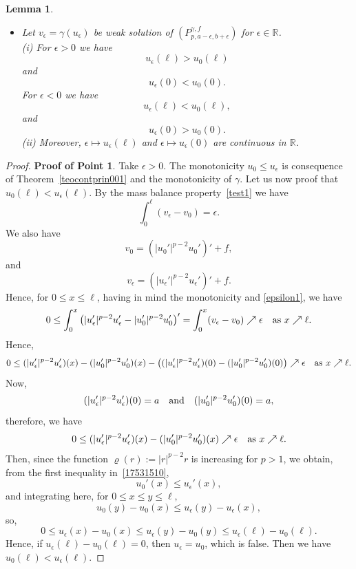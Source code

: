 \documentclass[reqno,12pt]{amsart}
\newtheorem{lemma}[theorem]{Lemma} %
\numberwithin{equation}{section} %
\begin{document}
\begin{lemma}
\begin{itemize}
\item[3.] Let   $v_\epsilon=\gamma(u_\epsilon)$ be weak solution of $(P_{p,a-\epsilon,b+\epsilon}^{\gamma,f})$ for $\epsilon\in \mathbb{R}$.
\\
(i) For $\epsilon>0$ we have
$$u_\epsilon(\ell)> u_0(\ell)$$ and
$$u_\epsilon(0)< u_0(0).$$
 For $\epsilon<0$ we have
$$u_\epsilon(\ell)< u_0(\ell),$$ and
$$u_\epsilon(0)> u_0(0).$$
(ii) Moreover, $\epsilon\mapsto u_\epsilon(\ell)$ and $\epsilon\mapsto u_\epsilon(0)$ are continuous in $\mathbb{R}$. 
 \end{itemize}
 \end{lemma}
 
 \begin{proof}  {\bf Proof of Point 1}.    Take  $\epsilon>0$.  The monotonicity  $ u_0 \leq u_\epsilon$ is consequence of Theorem~\ref{teocontprin001} and the monotonicity of $\gamma$. 
 Let us now proof that $u_0(\ell) <u_\epsilon(\ell)$. 
By the mass balance property~\eqref{test1} we have
  \begin{equation}\label{epsilon1}
\int_0^{\ell} (v_\epsilon - v_0) = \epsilon.
  \end{equation}
We also have 
$$v_0 = \left(|u_0'|^{p-2}u_0' \right)' + f,$$
and
  $$v_\epsilon = \left(|u_\epsilon'|^{p-2}u_\epsilon' \right)' + f. $$
Hence, for $0 \leq x \leq \ell$, having in mind the monotonicity and \eqref{epsilon1}, we have
$$0\le \int_0^x \left(  |u_\epsilon'|^{p-2}u_\epsilon'  -  |u_0'|^{p-2}u_0'   \right)'
= \int_0^x (v_\epsilon - v_0) \nearrow \epsilon \quad \hbox{as } x\nearrow \ell.$$
Hence,
$$0\le  (|u_\epsilon'|^{p-2}u_\epsilon') (x) -  (|u_0'|^{p-2}u_0') (x) - \left((|u_\epsilon'|^{p-2}u_\epsilon') (0) -  (|u_0'|^{p-2}u_0') (0) \right) \nearrow \epsilon \quad \hbox{as } x\nearrow \ell.$$
Now, 
$$(|u_\epsilon'|^{p-2}u_\epsilon') (0) = a \quad \hbox{and} \quad (|u_0'|^{p-2}u_0') (0) = a,$$
therefore, we have
\begin{equation}\label{17531510}
0 \leq (|u_\epsilon'|^{p-2}u_\epsilon') (x) -  (|u_0'|^{p-2}u_0') (x) \nearrow \epsilon \quad \hbox{as } x\nearrow \ell.
\end{equation}
Then, since the function $\varrho(r):= \vert r \vert^{p-2}r$ is   increasing for $p >1$, we obtain, from the first inequality in~\eqref{17531510},
$$u_0'(x) \leq u_\epsilon'(x),$$
 and integrating here, for $0\le x\le y\le \ell,$ 
$$u_0(y) - u_0(x)\leq u_\epsilon(y) -  u_\epsilon(x),$$
so,    
\begin{equation}\label{cry001}
0 \leq  u_\epsilon(x)  - u_0(x)\leq u_\epsilon(y) - u_0(y)\le u_\epsilon(\ell) - u_0(\ell).
\end{equation}
 Hence, if $u_\epsilon(\ell) - u_0(\ell)=0$, then $u_\epsilon=u_0$, which is false. Then we have $u_0(\ell) <u_\epsilon(\ell)$.


\end{proof}
\end{document}
